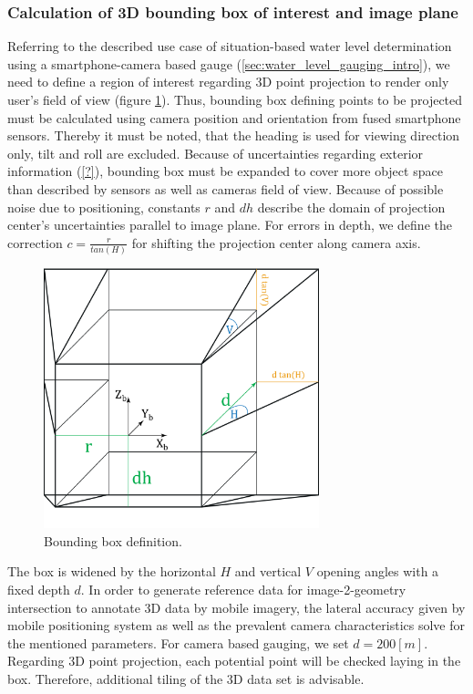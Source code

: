 \documentclass[review]{elsarticle}
\begin{document}
\subsubsection{Calculation of 3D bounding box of interest and image plane}
Referring to the described use case of situation-based water level determination using a smartphone-camera based gauge (\ref{sec:water_level_gauging_intro}), we need to define a region of interest regarding 3D point projection to render only user's field of view (figure \ref{fig:4_3_bounding_box}). Thus, bounding box defining points to be projected must be calculated using camera position and orientation from fused smartphone sensors. Thereby it must be noted, that the heading is used for viewing direction only, tilt and roll are excluded. Because of uncertainties regarding exterior information (\ref{?}), bounding box must be expanded to cover more object space than described by sensors as well as cameras field of view. Because of possible noise due to positioning, constants $r$ and $dh$ describe the domain of projection center's uncertainties parallel to image plane. For errors in depth, we define the correction $c = \frac{r}{tan(H)}$ for shifting the projection center along camera axis. 
\begin{figure}[h]
\centering
\includegraphics[width=8cm]{graphics/4_3_Bounding_Box}
\caption{Bounding box definition.}
\label{fig:4_3_bounding_box}
\end{figure}
The box is widened by the horizontal $H$ and vertical $V$ opening angles with a fixed depth $d$. In order to generate reference data for image-2-geometry intersection to annotate 3D data by mobile imagery, the lateral accuracy given by mobile positioning system as well as the prevalent camera characteristics solve for the mentioned parameters. For camera based gauging, we set $d = 200 [m]$. Regarding 3D point projection, each potential point will be checked laying in the box. Therefore, additional tiling of the 3D data set is advisable.
\end{document}
